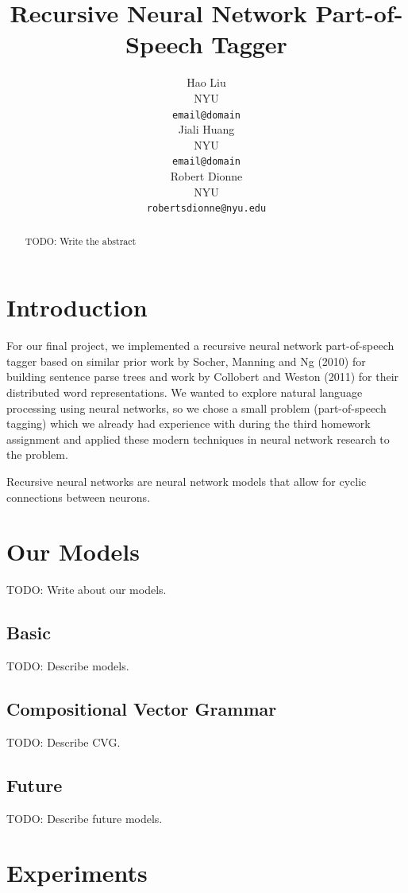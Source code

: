 \documentclass[11pt]{article}
\title{Recursive Neural Network Part-of-Speech Tagger}
\author{Hao Liu \\
  NYU \\
  {\tt email@domain} \\\And
  Jiali Huang \\
  NYU \\
  {\tt email@domain} \\\And
  Robert Dionne \\
  NYU \\
  {\tt robertsdionne@nyu.edu} \\}
\date{}
\begin{document}
\maketitle
\begin{abstract}
  TODO: Write the abstract
\end{abstract}

\section{Introduction}

For our final project, we implemented a recursive neural network part-of-speech tagger based on similar prior work by Socher, Manning and Ng (2010) for building sentence parse trees and work by Collobert and Weston (2011) for their distributed word representations. We wanted to explore natural language processing using neural networks, so we chose a small problem (part-of-speech tagging) which we already had experience with during the third homework assignment and applied these modern techniques in neural network research to the problem.

Recursive neural networks are neural network models that allow for cyclic connections between neurons. 

\section{Our Models}

TODO: Write about our models.

\subsection{Basic}

TODO: Describe models.

\subsection{Compositional Vector Grammar}

TODO: Describe CVG.

\subsection{Future}

TODO: Describe future models.

\section{Experiments}
\end{document}
